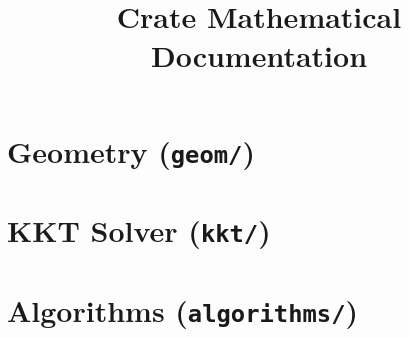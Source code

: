 \documentclass{article}
\title{Crate Mathematical Documentation}
\author{}
\date{}
\begin{document}
\maketitle
\tableofcontents
\newpage

\section{Geometry (\texttt{geom/})}


\section{KKT Solver (\texttt{kkt/})}


\section{Algorithms (\texttt{algorithms/})}

\end{document}
